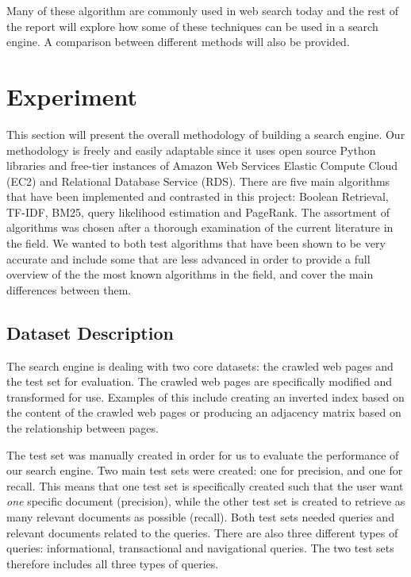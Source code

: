 Many of these algorithm are commonly used in web search today and the rest of the report will explore how some of these techniques can be used in a search engine. A comparison between different methods will also be provided.




\section{Experiment} %
\label{sec:experiment}

This section will present the overall methodology of building a search engine. Our methodology is freely and easily adaptable since it uses open source Python libraries and free-tier instances of Amazon Web Services Elastic Compute Cloud (EC2) and Relational Database Service (RDS). There are five main algorithms that have been implemented and contrasted in this project: Boolean Retrieval, TF-IDF, BM25, query likelihood estimation and PageRank. The assortment of algorithms was chosen after a thorough examination of the current literature in the field. We wanted to both test algorithms that have been shown to be very accurate and include some that are less advanced in order to provide a full overview of the the most known algorithms in the field, and cover the main differences between them. 

\subsection{Dataset Description} %
\label{sub:dataset_description}

The search engine is dealing with two core datasets: the crawled web pages and the test set for evaluation. The crawled web pages are specifically modified and transformed for use. Examples of this include creating an inverted index based on the content of the crawled web pages or producing an adjacency matrix based on the relationship between pages.

The test set was manually created in order for us to evaluate the performance of our search engine. Two main test sets were created: one for precision, and one for recall. This means that one test set is specifically created such that the user want \emph{one} specific document (precision), while the other test set is created to retrieve as many relevant documents as possible (recall). Both test sets needed queries and relevant documents related to the queries. There are also three different types of queries: informational, transactional and navigational queries. The two test sets therefore includes all three types of queries.

